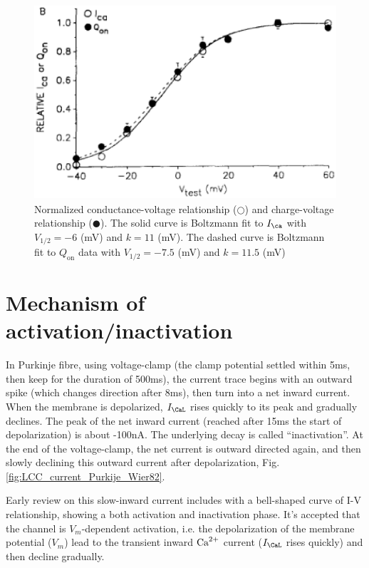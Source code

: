 \begin{figure}[hbt]
  \centerline{\includegraphics[height=7.2cm,
    angle=0]{./images/LCC_Vm_activation_Hadley1991}}
\caption{Normalized conductance-voltage relationship ($\Circle$) and
charge-voltage relationship ($\CIRCLE$). The solid curve is Boltzmann fit to
$I_\ca$ with $V_{1/2} = -6$ (mV) and $k = 11$ (mV). The dashed curve is
Boltzmann fit to $Q_\text{on}$ data with $V_{1/2} = -7.5$ (mV) and $k=11.5$ (mV)}
\label{fig:LCC_Vm_activation_Hadley1991}
\end{figure}

 

\section{Mechanism of activation/inactivation}
\label{sec:LCC_activation_inactivation}

In Purkinje fibre, using voltage-clamp (the clamp potential settled within 5ms,
then keep for the duration of 500ms)\citep{wier1982}, the current trace begins
with an outward spike (which changes direction after 8ms), then turn into a net
inward current. When the membrane is depolarized, $I_\CaL$ rises quickly to its
peak and gradually declines. The peak of the net inward current (reached after
15ms the start of depolarization) is about -100nA.  The underlying decay is called
``inactivation''. At the end of the voltage-clamp, the net current is outward
directed again, and then slowly declining this outward current after
depolarization, Fig.\ref{fig:LCC_current_Purkije_Wier82}.

Early review on this slow-inward current includes \citep{mcdonald1982} with a
bell-shaped curve of I-V relationship, showing a both activation and
inactivation phase. It's accepted that the channel is $V_m$-dependent
activation, i.e. the depolarization of the membrane potential ($V_m$) lead to
the transient inward ${\text{Ca}^{2+}}$ current ($I_\CaL$ rises quickly) and then decline
gradually. 
 
